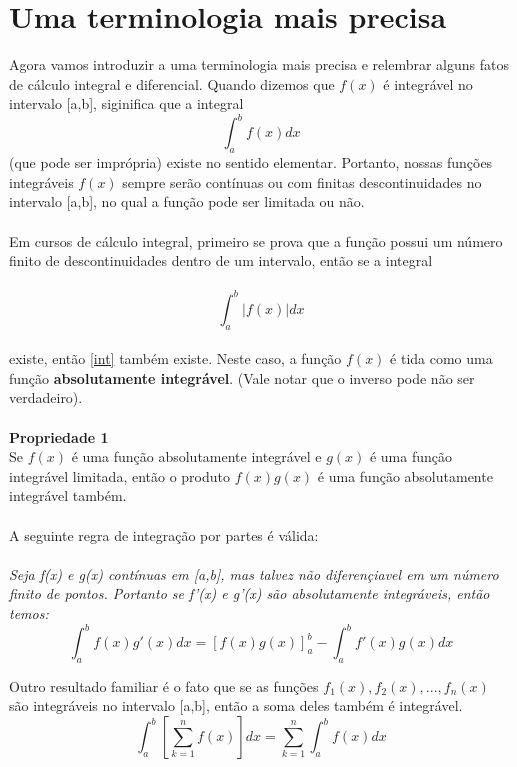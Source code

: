 \section{ Uma terminologia mais precisa}
Agora vamos introduzir a uma terminologia mais precisa e relembrar alguns fatos
de cálculo integral e diferencial. Quando dizemos que $f(x)$ é integrável no 
intervalo [a,b], siginifica que a integral\\
\begin{equation}
\label{int}
    \int_{a}^{b}f(x)dx 
\end{equation}
(que pode ser imprópria) existe no sentido elementar. Portanto, nossas funções 
integráveis $f(x)$ sempre serão contínuas ou com finitas descontinuidades no 
intervalo [a,b], no qual a função pode ser limitada ou não.\\
\\
Em cursos de cálculo integral, primeiro se prova que a função possui um número
finito de descontinuidades dentro de um intervalo, então se a integral\\
\\
\begin{equation}
    \int_{a}^{b}|f(x)|dx 
\end{equation} 
\\
existe, então \ref{int} também existe. Neste caso, a função $f(x)$ é tida como
uma função \textbf{absolutamente integrável}. (Vale notar que o inverso pode não
ser verdadeiro).\\
\\
\textbf{Propriedade 1}\\
Se $f(x)$ é uma função absolutamente integrável e $g(x)$ é uma função integrável
limitada, então o produto $f(x)g(x)$ é uma função absolutamente integrável também.
\\
\\
A seguinte regra de integração por partes é válida:\\
\\
\textit{Seja f(x) e g(x) contínuas em [a,b], mas talvez não diferençiavel
em um número finito de pontos. Portanto se f'(x) e g'(x) são absolutamente 
integráveis, então temos:}\\
\begin{equation}
    \int_{a}^{b}f(x)g'(x) dx = [f(x)g(x)]_{a}^{b} - \int_{a}^{b}f'(x)g(x) dx
\end{equation}

Outro resultado familiar é o fato que se as funções $f_1(x), f_2(x), ..., f_n(x)$
são integráveis no intervalo [a,b], então a soma deles também é integrável.\\
\begin{equation}
\label{43}
    \int_{a}^{b}[\sum\limits_{k=1}^{n}f(x)]dx = \sum\limits_{k=1}^{n}\int_{a}^{b}f(x)dx
\end{equation}

